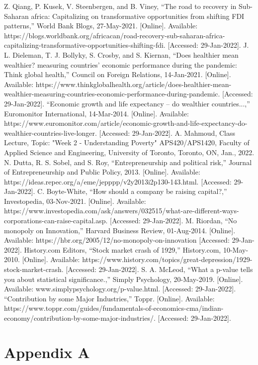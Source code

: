 \documentclass[15pt]{article}
\begin{document}
\begin{flushleft}
\begin{thebibliography}{9}
\newpage\noindent
{} Z. Qiang, P. Kusek, V. Steenbergen, and B. Viney, “The road to recovery in Sub-Saharan africa: Capitalizing on transformative opportunities from shifting FDI patterns,” World Bank Blogs, 27-May-2021. [Online]. Available: https://blogs.worldbank.org/africacan/road-recovery-sub-saharan-africa-capitalizing-transformative-opportunities-shifting-fdi. [Accessed: 29-Jan-2022]. 
 J. L. Dieleman, T. J. Bollyky, S. Crosby, and S. Kiernan, “Does healthier mean wealthier? measuring countries' economic performance during the pandemic: Think global health,” Council on Foreign Relations, 14-Jan-2021. [Online]. Available: https://www.thinkglobalhealth.org/article/does-healthier-mean-wealthier-measuring-countries-economic-performance-during-pandemic. [Accessed: 29-Jan-2022]. 
 “Economic growth and life expectancy – do wealthier countries...,”  Euromonitor International, 14-Mar-2014. [Online]. Available: https://www.euromonitor.com/article/economic-growth-and-life-expectancy-do-wealthier-countries-live-longer. [Accessed: 29-Jan-2022]. 
 A. Mahmoud, Class Lecture, Topic: "Week 2 - Understanding Poverty" APS420/APS1420, Faculty of Applied Science and Engineering, University of Toronto, Toronto, ON, Jan., 2022.
 N. Dutta, R. S. Sobel, and S. Roy, “Entrepreneurship and political risk,” Journal of Entrepreneurship and Public Policy, 2013. [Online]. Available: https://ideas.repec.org/a/eme/jepppp/v2y2013i2p130-143.html. [Accessed: 29-Jan-2022]. 
 C. Boyte-White, “How should a company be raising capital?,” Investopedia, 03-Nov-2021. [Online]. Available: https://www.investopedia.com/ask/answers/032515/what-are-different-ways-corporations-can-raise-capital.asp. [Accessed: 29-Jan-2022]. 
 M. Riordan, “No monopoly on Innovation,” Harvard Business Review, 01-Aug-2014. [Online]. Available: https://hbr.org/2005/12/no-monopoly-on-innovation [Accessed: 29-Jan-2022]. 
 History.com Editors, “Stock market crash of 1929,” History.com, 10-May-2010. [Online]. Available: https://www.history.com/topics/great-depression/1929-stock-market-crash. [Accessed: 29-Jan-2022]. 
 S. A. McLeod, “What a p-value tells you about statistical significance.,” Simply Psychology, 20-May-2019. [Online]. Available: www.simplypsychology.org/p-value.html. [Accessed: 29-Jan-2022]. 
 “Contribution by some Major Industries,” Toppr. [Online]. Available: https://www.toppr.com/guides/fundamentals-of-economics-cma/indian-economy/contribution-by-some-major-industries/. [Accessed: 29-Jan-2022]. 
\end{thebibliography}
\end{flushleft}

\newpage

\section{Appendix A}

\lstset{
  breaklines=true,
}

\end{document}
